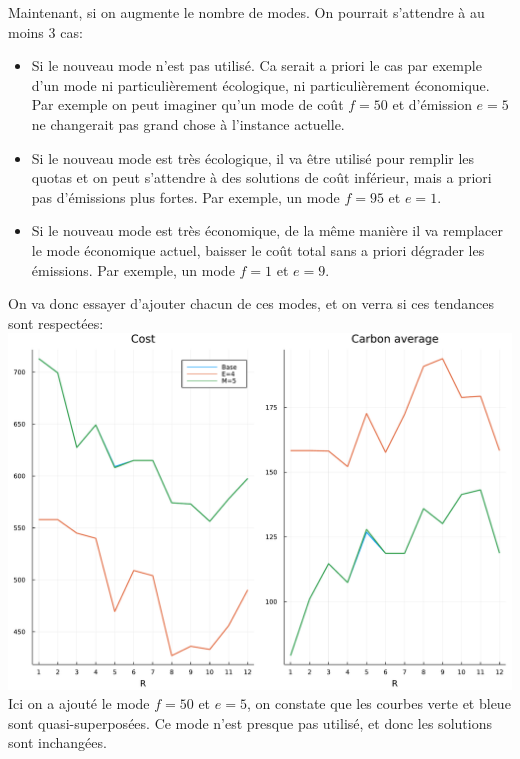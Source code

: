 \documentclass{article}
\begin{document}
	Maintenant, si on augmente le nombre de modes. On pourrait s'attendre à au moins 3 cas:\\
	\begin{itemize}
		\item Si le nouveau mode n'est pas utilisé. Ca serait a priori le cas par exemple d'un mode ni particulièrement écologique, ni particulièrement économique. Par exemple on peut imaginer qu'un mode de coût $f=50$ et d'émission $e=5$ ne changerait pas grand chose à l'instance actuelle.
		\item Si le nouveau mode est très écologique, il va être utilisé pour remplir les quotas et on peut s'attendre à des solutions de coût inférieur, mais a priori pas d'émissions plus fortes. Par exemple, un mode $f=95$ et $e=1$.
		\item Si le nouveau mode est très économique, de la même manière il va remplacer le mode économique actuel, baisser le coût total sans a priori dégrader les émissions. Par exemple, un mode $f=1$ et $e=9$.
	\end{itemize}
	On va donc essayer d'ajouter chacun de ces modes, et on verra si ces tendances sont respectées:
	\newpage
	\includegraphics[width=\textwidth]{graph3.pdf}\\
	Ici on a ajouté le mode $f=50$ et $e=5$, on constate que les courbes verte et bleue sont quasi-superposées. Ce mode n'est presque pas utilisé, et donc les solutions sont inchangées.\\\newpage
\end{document}
